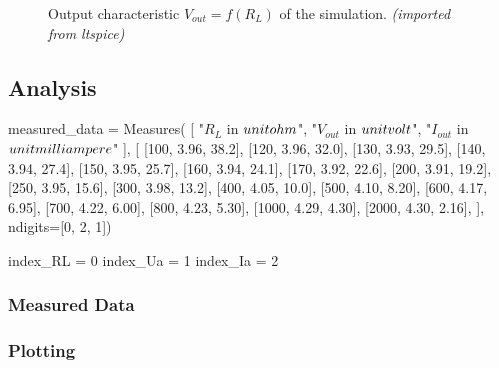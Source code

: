 \begin{figure}[H]
    \centering
    \caption{Output characteristic \textbf{$V_{out} = f(R_L)$} of the simulation. \textit{(imported from ltspice)}}
\end{figure}

\subsection{Analysis}

\begin{sagesilent}
    measured_data = Measures(
        [
            "$R_L$ in $\\unit{\\ohm}$",
            "$V_{out}$ in $\\unit{\\volt}$", 
            "$I_{out}$ in $\\unit{\\milli\\ampere}$"
        ], [
            [100, 3.96, 38.2],
            [120, 3.96, 32.0],
            [130, 3.93, 29.5],
            [140, 3.94, 27.4],
            [150, 3.95, 25.7],
            [160, 3.94, 24.1],
            [170, 3.92, 22.6],
            [200, 3.91, 19.2],
            [250, 3.95, 15.6],
            [300, 3.98, 13.2],
            [400, 4.05, 10.0],
            [500, 4.10, 8.20],
            [600, 4.17, 6.95],
            [700, 4.22, 6.00],
            [800, 4.23, 5.30],
            [1000, 4.29, 4.30],
            [2000, 4.30, 2.16],
    ], ndigits=[0, 2, 1])

    index_RL = 0
    index_Ua = 1
    index_Ia = 2
\end{sagesilent}

\subsubsection{Measured Data}

\begin{table}[H]
    \centering
    \renewcommand{\arraystretch}{1.2}
\end{table}

\subsubsection{Plotting}


